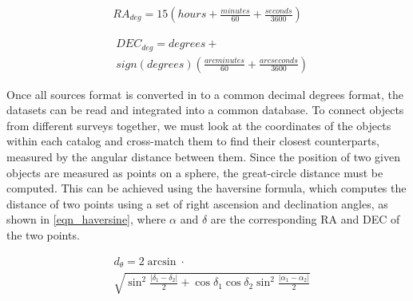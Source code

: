 \documentclass[11pt,sigconf]{acmart}
\begin{document}
\begin{equation} \label{eqn_ra}
  \begin{split}
    RA_{deg}= 15(hours + \frac{minutes}{60} + \frac{seconds}{3600}) 
  \end{split}
\end{equation}

\begin{equation} \label{eqn_dec}
  \begin{split}
  & DEC_{deg}= degrees+ \\
  & sign(degrees)(\frac{arcminutes}{60} + \frac{arcseconds}{3600})
  \end{split}
\end{equation}

Once all sources format is converted in to a common decimal degrees format, the 
datasets can be read and integrated into a common database. To connect objects 
from different surveys together, we must look at the coordinates of the
objects within each catalog and cross-match them to find their closest counterparts, 
measured by the angular distance between them. Since the position of two given 
objects are measured as points on a sphere, the great-circle distance must be 
computed. This can be achieved using the haversine formula, which computes the 
distance of two points using a set of right ascension and declination angles, 
as shown in \ref{eqn_haversine}, where $\alpha$ and $\delta$ are the corresponding
RA and DEC of the two points.

\begin{equation} \label{eqn_haversine}
  \begin{split}
   & d_{\theta} = 2 \arcsin \cdot \\
   & {\sqrt{\sin^2\frac{\left| \delta_1 - \delta_2 \right|}{2} + \cos{\delta_1}\cos{\delta_2}\sin^2\frac{\left| \alpha_1 - \alpha_2 \right|}{2}}}  
  \end{split}
\end{equation}
\end{document}
